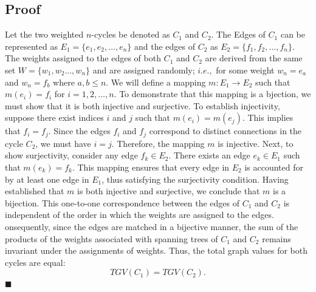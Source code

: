 \documentclass[12pt,letterpaper]{article}
\begin{document}
\subsection{Proof}

Let the two weighted $n$-cycles be denoted as $C_{1}$ and $C_{2}$. The Edges of $C_{1}$ can be represented as $E_{1}=\{e_{1},e_{2},\ldots,e_{n}\}$ and the edges of $C_{2}$ as $E_{2}=\{f_{1},f_{2},\ldots,f_{n}\}$. The weights assigned to the edges of both $C_{1}$ and $C_{2}$ are derived from the same set $W=\{w_{1},w_{2}\ldots,w_{n}\}$ and are assigned randomly; $i.e.,$ for some weight $w_{n}=e_{a}$ and $w_{n}=f_{b}$ where $a,b \le n$. We will define a mapping $m:E_{1}\rightarrow E_{2}$ such that $m(e_{i})=f_{i}$ for $i=1,2,\ldots,n$. To demonstrate that this mapping is a bjection, we must show that it is both injective and surjective. To establish injectivity, suppose there exist indices $i$ and $j$ such that $m(e_{i})=m(e_{j})$. This implies that $f_{i}=f_{j}$. Since the edges $f_{i}$ and $f_{j}$ correspond to distinct connections in the cycle $C_{2}$, we must have $i=j$. Therefore, the mapping $m$ is injective. Next, to show surjectivity, consider any edge $f_{k}\in E_{2}$. There exists an edge $e_{k}\in E_{1}$ such that $m(e_{k})=f_{k}$. This mapping ensures that every edge in $E_{2}$ is accounted for by at least one edge in $E_{1}$, thus satisfying the surjectivity condition. Having established that $m$ is both injective and surjective, we conclude that $m$ is a bijection. This one-to-one correspondence between the edges of $C_{1}$ and $C_{2}$ is independent of the order in which the weights are assigned to the edges. onsequently, since the edges are matched in a bijective manner, the sum of the products of the weights associated with spanning trees of $C_{1}$ and $C_{2}$ remains invariant under the assignments of weights. Thus, the total graph values for both cycles are equal: $$TGV(C_{1})=TGV(C_{2}).$$
$\blacksquare$\\

\end{document}
